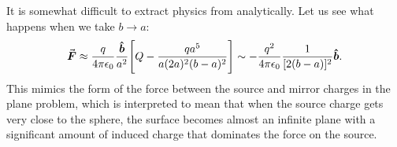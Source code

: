 It is somewhat difficult to extract physics from  analytically.
Let us see what happens when we take $b \rightarrow a$:
\begin{eqnarray}
    \va*{F} \approx \frac{q}{4 \pi \epsilon_0} \frac{\vu*{b}}{a^2} \Bigg[ Q - \frac{q a^5}{a (2a)^2 (b-a)^2} \Bigg] \sim - \frac{q^2}{4 \pi \epsilon_0} \frac{1}{[2(b-a)]^2} \vu*{b}
.\end{eqnarray}
This mimics the form of the force between the source and mirror charges in the plane problem, which is interpreted to mean that when the source charge gets very close to the sphere, the surface becomes almost an infinite plane with a significant amount of induced charge that dominates the force on the source.



